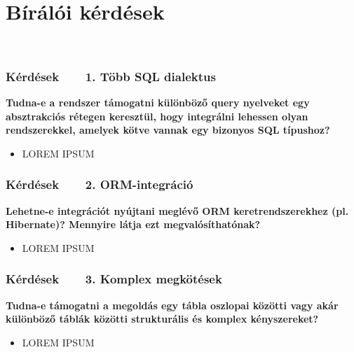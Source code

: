\documentclass[
    aspectratio=169,
]{beamer}
\newcommand{\slidetitle}[2]{\frametitle{{\small #1 ~ \ding{226} ~ } \normalsize \textbf{#2} }}
\begin{document}
\appendix
\begingroup
{}

\section{Bírálói kérdések}
\def\sectionshorttitle{Kérdések}

\begin{frame}[noframenumbering]
    ~~~
\end{frame}

\begin{frame}[t,noframenumbering]
    \slidetitle{\sectionshorttitle}{1. Több SQL dialektus}
    
    \textbf{%
    Tudna-e a rendszer támogatni különböző query nyelveket
    egy absztrakciós rétegen keresztül,
    hogy integrálni lehessen olyan rendszerekkel,
    amelyek kötve vannak egy bizonyos SQL típushoz?
    }
    
    \vspace{0.7cm}
    
    \begin{itemize}
        \setlength\itemsep{1em}
        \item LOREM IPSUM
    \end{itemize}
\end{frame}

\begin{frame}[t,noframenumbering]
    \slidetitle{\sectionshorttitle}{2. ORM-integráció}
    
    \textbf{%
    Lehetne-e integrációt nyújtani meglévő ORM keretrendszerekhez
    (pl. Hibernate)?
    Mennyire látja ezt megvalósíthatónak?
    }
    
    \vspace{0.7cm}
    
    \begin{itemize}
        \setlength\itemsep{1em}
        \item LOREM IPSUM
    \end{itemize}
\end{frame}

\begin{frame}[t,noframenumbering]
    \slidetitle{\sectionshorttitle}{3. Komplex megkötések}
    
    \textbf{%
    Tudna-e támogatni a megoldás egy tábla oszlopai közötti
    vagy akár különböző táblák közötti
    strukturális és komplex kényszereket?
    }
    
    \vspace{0.7cm}
    
    \begin{itemize}
        \setlength\itemsep{1em}
        \item LOREM IPSUM
    \end{itemize}
\end{frame}

\endgroup
\end{document}
